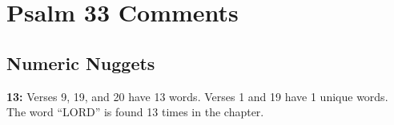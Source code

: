 \section{Psalm 33 Comments}

\subsection{Numeric Nuggets}
\textbf{13: } Verses 9, 19, and 20 have 13 words. Verses 1 and 19 have 1 unique words. The word ``LORD'' is found 13 times in the chapter.